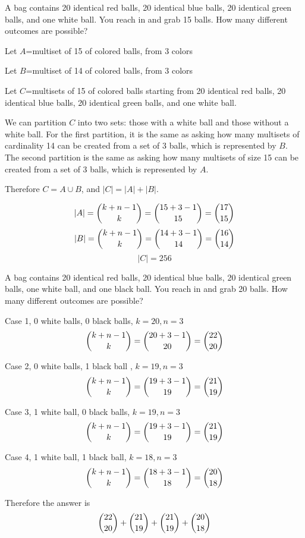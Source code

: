 \documentclass[openany, 12pt]{book}
\begin{document}
\begin{exercise}{}{}
	A bag contains 20 identical red balls, 20 identical blue balls, 20 identical
	green balls, and one white ball. You reach in and grab 15 balls. How many
	different outcomes are possible?
	\begin{alist}
		\item Let $A$=multiset of 15 of colored balls, from 3 colors
		\item Let $B$=multiset of 14 of colored balls, from 3 colors
		\item Let $C$=multisets of 15 of colored balls starting from 20
		identical red balls, 20 identical blue balls, 20 identical green balls, and
		one white ball.
		\item We can partition $C$ into two sets: those with a white ball and those
		without a white ball. For the first partition, it is the same as asking how
		many multisets of cardinality 14 can be created from a set of 3 balls, which
		is represented by $B$. The second partition is the same as asking how many
		multisets of size 15 can be created from a set of 3 balls, which is
		represented by $A$.
		\item Therefore $C=A \cup B$, and $|C| = |A| + |B|$.
		\item
		$$ |A| = \dbinom{k+n-1}{k} = \dbinom{15+3-1}{15}=\dbinom{17}{15}$$
		$$ |B| = \dbinom{k+n-1}{k} = \dbinom{14+3-1}{14}=\dbinom{16}{14}$$
		$$ |C| = 256 $$
	\end{alist}
\end{exercise}

\begin{exercise}{}{}A bag contains 20 identical red balls, 20 identical blue
	balls, 20 identical green balls, one white ball, and one black ball. You
	reach in and grab 20 balls. How many different outcomes are possible?
	\begin{alist}
		\item Case 1, 0 white balls, 0 black balls, $k=20, n=3$
		$$ \dbinom{k+n-1}{k} = \dbinom{20+3-1}{20}=\dbinom{22}{20}$$
		\item Case 2, 0 white balls, 1 black ball , $k=19, n=3$
		$$ \dbinom{k+n-1}{k} = \dbinom{19+3-1}{19}=\dbinom{21}{19}$$
		\item Case 3, 1 white ball, 0 black balls, $k=19, n=3$
		$$ \dbinom{k+n-1}{k} = \dbinom{19+3-1}{19}=\dbinom{21}{19}$$
		\item Case 4, 1 white ball, 1 black ball, $k=18, n=3$
		$$ \dbinom{k+n-1}{k} = \dbinom{18+3-1}{18}=\dbinom{20}{18}$$
		\item Therefore the answer is
		$$ \dbinom{22}{20} +\dbinom{21}{19} +\dbinom{21}{19} +\dbinom{20}{18}$$
	\end{alist}
\end{exercise}
\end{document}
